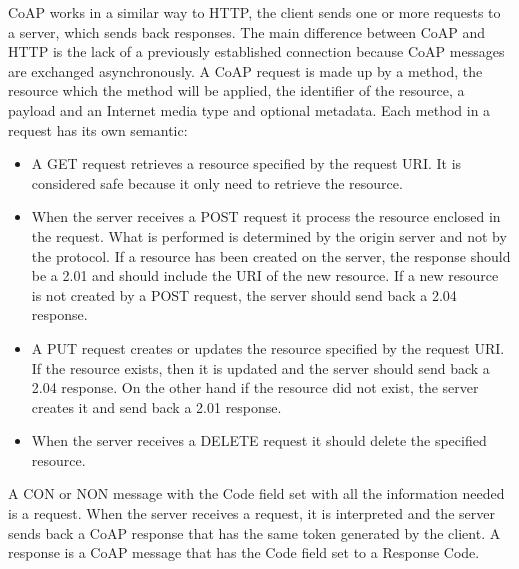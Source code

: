 	CoAP works in a similar way to HTTP, the client sends one or more requests to a server, which sends back responses.\newline
	The main difference between CoAP and HTTP is the lack of a previously established connection because CoAP messages are exchanged asynchronously.\newline
	A CoAP request is made up by a method, the resource which the method will be applied, the identifier of the resource,
	a payload and an Internet media type and optional metadata.\newline
	Each method in a request has its own semantic:
	\begin{itemize}
		\item A GET request retrieves a resource specified by the request URI.
		It is considered safe because it only need to retrieve the resource.
		
		\item When the server receives a POST request it process the resource enclosed in the request.
		What is performed is determined by the origin server and not by the protocol.
		If a resource has been created on the server, the response should be a 2.01 and should include the URI of the new resource.
		If a new resource is not created by a POST request, the server should send back a 2.04 response.
		
		\item A PUT request creates or updates the resource specified by the request URI.
		If the resource exists, then it is updated and the server should send back a 2.04 response.
		On the other hand if the resource did not exist, the server creates it and send back a 2.01 response.
		
		\item When the server receives a DELETE request it should delete the specified resource.
		
	\end{itemize}
	
	A CON or NON message with the Code field set with all the information needed is a request.\newline
	When the server receives a request, it is interpreted and the server sends back a CoAP response that has the same token generated by the client.\newline
	A response is a CoAP message that has the Code field set to a Response Code.\newline

